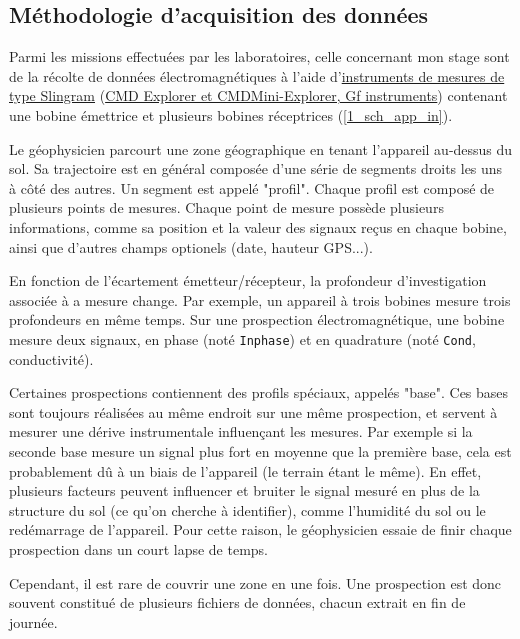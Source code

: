 \documentclass[12pt]{article}
\begin{document}
\subsection{Méthodologie d'acquisition des données}

    \label{1_sch_app_out} Parmi les missions effectuées par les laboratoires, celle concernant mon stage sont de la récolte de données électromagnétiques à l'aide d'\href{https://fr.wikipedia.org/wiki/G%C3%A9ophysique_appliqu%C3%A9e#Prospection_%C3%A9lectromagn%C3%A9tique}{instruments de mesures de type Slingram} (\href{https://www.geomatrix.co.uk/rentals/land-products/electromagnetic/cmd-explorer/}{CMD Explorer et CMDMini-Explorer, Gf instruments}) contenant une bobine émettrice et plusieurs bobines réceptrices (\ref{1_sch_app_in}).
    
    Le géophysicien parcourt une zone géographique en tenant l'appareil au-dessus du sol. Sa trajectoire est en général composée d'une série de segments droits les uns à côté des autres. Un segment est appelé "profil". Chaque profil est composé de plusieurs points de mesures. Chaque point de mesure possède plusieurs informations, comme sa position et la valeur des signaux reçus en chaque bobine, ainsi que d'autres champs optionels (date, hauteur GPS...).

    En fonction de l'écartement émetteur/récepteur, la profondeur d'investigation associée à a mesure change. Par exemple, un appareil à trois bobines mesure trois profondeurs en même temps. Sur une prospection électromagnétique, une bobine mesure deux signaux, en phase (noté \texttt{Inphase}) et en quadrature (noté \texttt{Cond}, conductivité).

    Certaines prospections contiennent des profils spéciaux, appelés "base". Ces bases sont toujours réalisées au même endroit sur une même prospection, et servent à mesurer une dérive instrumentale influençant les mesures. Par exemple si la seconde base mesure un signal plus fort en moyenne que la première base, cela est probablement dû à un biais de l'appareil (le terrain étant le même). En effet, plusieurs facteurs peuvent influencer et bruiter le signal mesuré en plus de la structure du sol (ce qu'on cherche à identifier), comme l'humidité du sol ou le redémarrage de l'appareil. Pour cette raison, le géophysicien essaie de finir chaque prospection dans un court lapse de temps.

    Cependant, il est rare de couvrir une zone en une fois. Une prospection est donc souvent constitué de plusieurs fichiers de données, chacun extrait en fin de journée.\\
\end{document}
